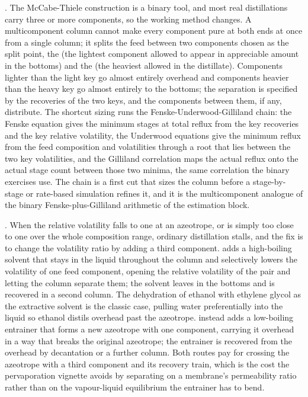. The McCabe-Thiele
construction is a binary tool, and most real distillations carry three or more
components, so the working method changes. A multicomponent column cannot make
every component pure at both ends at once from a single column; it splits the
feed between two components chosen as the split point, the 
(the lightest component allowed to appear in appreciable amount in the bottoms)
and the  (the heaviest allowed in the distillate). Components
lighter than the light key go almost entirely overhead and components heavier
than the heavy key go almost entirely to the bottoms; the separation is
specified by the recoveries of the two keys, and the components between them, if
any, distribute. The shortcut sizing runs the Fenske-Underwood-Gilliland chain:
the Fenske equation gives the minimum stages at total reflux from the key
recoveries and the key relative volatility, the Underwood equations give the
minimum reflux from the feed composition and volatilities through a root that
lies between the two key volatilities, and the Gilliland correlation maps the
actual reflux onto the actual stage count between those two minima, the same
correlation the binary exercises use. The chain is a first cut that sizes the
column before a stage-by-stage or rate-based simulation refines it, and it is
the multicomponent analogue of the binary Fenske-plus-Gilliland arithmetic of
the estimation block.

. When the relative volatility
falls to one at an azeotrope, or is simply too close to one over the whole
composition range, ordinary distillation stalls, and the fix is to change the
volatility ratio by adding a third component. 
adds a high-boiling solvent that stays in the liquid throughout the column and
selectively lowers the volatility of one feed component, opening the relative
volatility of the pair and letting the column separate them; the solvent leaves
in the bottoms and is recovered in a second column. The dehydration of ethanol
with ethylene glycol as the extractive solvent is the classic case, pulling
water preferentially into the liquid so ethanol distils overhead past the
azeotrope.  instead adds a low-boiling
entrainer that forms a new azeotrope with one component, carrying it overhead in
a way that breaks the original azeotrope; the entrainer is recovered from the
overhead by decantation or a further column. Both routes pay for crossing the
azeotrope with a third component and its recovery train, which is the cost the
pervaporation vignette avoids by separating on a membrane's permeability ratio
rather than on the vapour-liquid equilibrium the entrainer has to bend.

